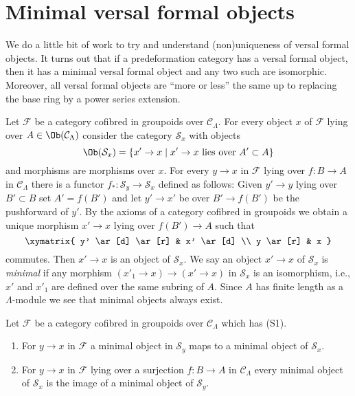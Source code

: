 




\section{Minimal versal formal objects}
\label{section-minimal-versal}

\noindent
We do a little bit of work to try and understand (non)uniqueness
of versal formal objects. It turns out that if a predeformation category
has a versal formal object, then it has a minimal versal formal
object and any two such are isomorphic. Moreover, all versal formal
objects are ``more or less'' the same up to replacing the base ring
by a power series extension.

\medskip\noindent
Let $\mathcal{F}$ be a category cofibred in groupoids over
$\mathcal{C}_\Lambda$. For every object $x$ of $\mathcal{F}$
lying over $A \in \Ob(\mathcal{C}_\Lambda)$ consider the
category $\mathcal{S}_x$ with objects
$$
\Ob(\mathcal{S}_x) =
\{x' \to x \mid x' \to x\text{ lies over }A' \subset A\}
$$
and morphisms are morphisms over $x$. For every $y \to x$ in
$\mathcal{F}$ lying over $f : B \to A$
in $\mathcal{C}_\Lambda$ there is a functor
$f_* : \mathcal{S}_y \to \mathcal{S}_x$ defined as follows:
Given $y' \to y$ lying over $B' \subset B$ set $A' = f(B')$
and let $y' \to x'$ be over $B' \to f(B')$ be the pushforward of $y'$.
By the axioms of a category cofibred in groupoids we obtain a
unique morphism $x' \to x$ lying over $f(B') \to A$ such that
$$
\xymatrix{
y' \ar[d] \ar[r] & x' \ar[d] \\
y \ar[r] & x
}
$$
commutes. Then $x' \to x$ is an object of $\mathcal{S}_x$. We say an
object $x' \to x$ of $\mathcal{S}_x$ is {\it minimal} if any morphism
$(x'_1 \to x) \to (x' \to x)$ in $\mathcal{S}_x$ is an isomorphism, i.e.,
$x'$ and $x'_1$ are defined over the same subring of $A$. Since
$A$ has finite length as a $\Lambda$-module we see that minimal objects
always exist.

\begin{lemma}
\label{lemma-smallest-where-descends}
Let $\mathcal{F}$ be a category cofibred in groupoids over
$\mathcal{C}_\Lambda$ which has (S1).
\begin{enumerate}
\item For $y \to x$ in $\mathcal{F}$ a minimal
object in $\mathcal{S}_y$ maps to a minimal object of $\mathcal{S}_x$.
\item For $y \to x$ in $\mathcal{F}$ lying over a surjection
$f : B \to A$ in $\mathcal{C}_\Lambda$ every minimal object
of $\mathcal{S}_x$ is the image of a minimal object of
$\mathcal{S}_y$.
\end{enumerate}
\end{lemma}

